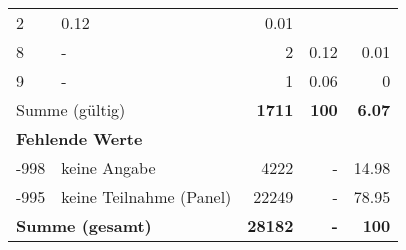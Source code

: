 \begin{longtable}{lXrrr}
       \num{2} &
       \num[round-mode=places,round-precision=2]{0,12} &
         \num[round-mode=places,round-precision=2]{0,01} \\

     8 &
     \multicolumn{1}{X}{ -  } &


       \num{2} &
       \num[round-mode=places,round-precision=2]{0,12} &
         \num[round-mode=places,round-precision=2]{0,01} \\

     9 &
     \multicolumn{1}{X}{ -  } &


       \num{1} &
       \num[round-mode=places,round-precision=2]{0,06} &
         \num[round-mode=places,round-precision=2]{0} \\
     \midrule
     \multicolumn{2}{l}{Summe (gültig)} &
       \textbf{\num{1711}} &
     \textbf{100} &
       \textbf{\num[round-mode=places,round-precision=2]{6,07}} \\
     \multicolumn{5}{l}{\textbf{Fehlende Werte}}\\
       -998 &
       keine Angabe &
         \num{4222} &
        - &
         \num[round-mode=places,round-precision=2]{14,98} \\
       -995 &
       keine Teilnahme (Panel) &
         \num{22249} &
        - &
         \num[round-mode=places,round-precision=2]{78,95} \\
     \midrule
     \multicolumn{2}{l}{\textbf{Summe (gesamt)}} &
          \textbf{\num{28182}} &
        \textbf{-} &
        \textbf{100} \\
     \bottomrule
     \end{longtable}
     
